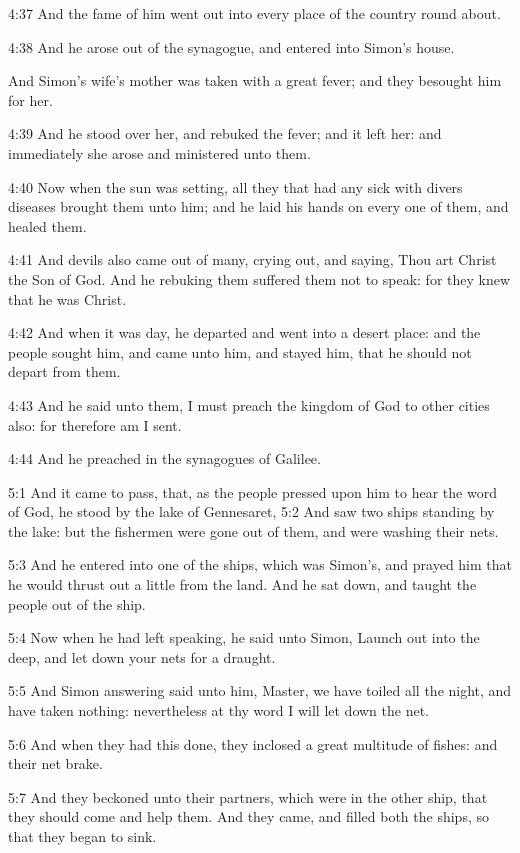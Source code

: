 4:37 And the fame of him went out into every place of the country round about.

4:38 And he arose out of the synagogue, and entered into Simon's house.

And Simon's wife's mother was taken with a great fever; and they besought him for her.

4:39 And he stood over her, and rebuked the fever; and it left her: and immediately she arose and ministered unto them.

4:40 Now when the sun was setting, all they that had any sick with divers diseases brought them unto him; and he laid his hands on every one of them, and healed them.

4:41 And devils also came out of many, crying out, and saying, Thou art Christ the Son of God. And he rebuking them suffered them not to speak: for they knew that he was Christ.

4:42 And when it was day, he departed and went into a desert place: and the people sought him, and came unto him, and stayed him, that he should not depart from them.

4:43 And he said unto them, I must preach the kingdom of God to other cities also: for therefore am I sent.

4:44 And he preached in the synagogues of Galilee.

5:1 And it came to pass, that, as the people pressed upon him to hear the word of God, he stood by the lake of Gennesaret, 5:2 And saw two ships standing by the lake: but the fishermen were gone out of them, and were washing their nets.

5:3 And he entered into one of the ships, which was Simon's, and prayed him that he would thrust out a little from the land. And he sat down, and taught the people out of the ship.

5:4 Now when he had left speaking, he said unto Simon, Launch out into the deep, and let down your nets for a draught.

5:5 And Simon answering said unto him, Master, we have toiled all the night, and have taken nothing: nevertheless at thy word I will let down the net.

5:6 And when they had this done, they inclosed a great multitude of fishes: and their net brake.

5:7 And they beckoned unto their partners, which were in the other ship, that they should come and help them. And they came, and filled both the ships, so that they began to sink.

